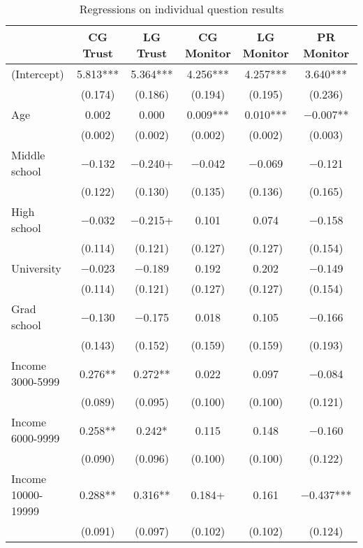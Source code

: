 \documentclass[
  letterpaper,
  DIV=11,
  numbers=noendperiod]{scrartcl}
\begin{document}
\hypertarget{tbl-basicreg}{}
\begin{table}
\caption{\label{tbl-basicreg}Regressions on individual question results }\tabularnewline

\centering
\begin{tabular}[t]{lccccc}
\toprule
  & CG Trust & LG Trust & CG Monitor & LG Monitor & PR Monitor\\
\midrule
(Intercept) & \num{5.813}*** & \num{5.364}*** & \num{4.256}*** & \num{4.257}*** & \num{3.640}***\\
 & (\num{0.174}) & (\num{0.186}) & (\num{0.194}) & (\num{0.195}) & (\num{0.236})\\
Age & \num{0.002} & \num{0.000} & \num{0.009}*** & \num{0.010}*** & \num{-0.007}**\\
 & (\num{0.002}) & (\num{0.002}) & (\num{0.002}) & (\num{0.002}) & (\num{0.003})\\
Middle school & \num{-0.132} & \num{-0.240}+ & \num{-0.042} & \num{-0.069} & \num{-0.121}\\
 & (\num{0.122}) & (\num{0.130}) & (\num{0.135}) & (\num{0.136}) & (\num{0.165})\\
High school & \num{-0.032} & \num{-0.215}+ & \num{0.101} & \num{0.074} & \num{-0.158}\\
 & (\num{0.114}) & (\num{0.121}) & (\num{0.127}) & (\num{0.127}) & \vphantom{1} (\num{0.154})\\
University & \num{-0.023} & \num{-0.189} & \num{0.192} & \num{0.202} & \num{-0.149}\\
 & (\num{0.114}) & (\num{0.121}) & (\num{0.127}) & (\num{0.127}) & (\num{0.154})\\
Grad school & \num{-0.130} & \num{-0.175} & \num{0.018} & \num{0.105} & \num{-0.166}\\
 & (\num{0.143}) & (\num{0.152}) & (\num{0.159}) & (\num{0.159}) & (\num{0.193})\\
Income 3000-5999 & \num{0.276}** & \num{0.272}** & \num{0.022} & \num{0.097} & \num{-0.084}\\
 & (\num{0.089}) & (\num{0.095}) & (\num{0.100}) & (\num{0.100}) & (\num{0.121})\\
Income 6000-9999 & \num{0.258}** & \num{0.242}* & \num{0.115} & \num{0.148} & \num{-0.160}\\
 & (\num{0.090}) & (\num{0.096}) & (\num{0.100}) & (\num{0.100}) & (\num{0.122})\\
Income 10000-19999 & \num{0.288}** & \num{0.316}** & \num{0.184}+ & \num{0.161} & \num{-0.437}***\\
 & (\num{0.091}) & (\num{0.097}) & (\num{0.102}) & (\num{0.102}) & (\num{0.124})\\

\end{tabular}
\end{table}
\end{document}

